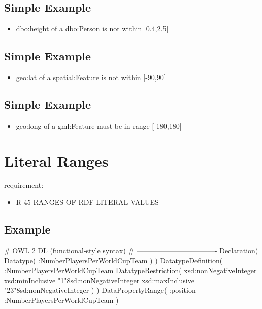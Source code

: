 \documentclass{llncs}
\begin{document}
\subsection{Simple Example}

\begin{itemize}
	\item dbo:height of a dbo:Person is not within [0.4,2.5]
\end{itemize}

\subsection{Simple Example}

\begin{itemize}
	\item geo:lat of a spatial:Feature is not within [-90,90]
\end{itemize}

\subsection{Simple Example}

\begin{itemize}
	\item geo:long of a gml:Feature must be in range [-180,180]
\end{itemize}



\section{Literal Ranges}

requirement:

\begin{itemize}
	\item R-45-RANGES-OF-RDF-LITERAL-VALUES
\end{itemize}



\subsection{Example}

\begin{ex}
# OWL 2 DL (functional-style syntax)
# ----------------------------------
Declaration( Datatype( :NumberPlayersPerWorldCupTeam ) ) 
DatatypeDefinition( 
    :NumberPlayersPerWorldCupTeam
    DatatypeRestriction( 
        xsd:nonNegativeInteger 
        xsd:minInclusive "1"^^xsd:nonNegativeInteger 
        xsd:maxInclusive "23"^^xsd:nonNegativeInteger ) )     
DataPropertyRange( :position :NumberPlayersPerWorldCupTeam ) 
\end{ex}
\end{document}
